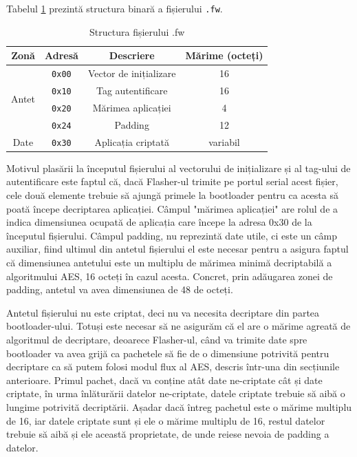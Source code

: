\documentclass[12pt,a4paper,titlepage]{report}
\begin{document}
Tabelul \ref{fwStruct} prezintă structura binară a fișierului \texttt{.fw}.

\begin{table}[h]
    \begin{tabular}{ | c | c | c | c | }
        \hline
        \textbf{Zonă} & \textbf{Adresă} & \textbf{Descriere} & \textbf{Mărime (octeți)} \\ \hline
        \multirow{4}{*}{Antet} & \texttt{0x00} & Vector de inițializare & 16 \\ \cline{2-4}
        & \texttt{0x10} & Tag autentificare & 16 \\ \cline{2-4}
        & \texttt{0x20} & Mărimea aplicației & 4 \\ \cline{2-4}   
        & \texttt{0x24} & Padding & 12 \\ \hline
        Date & \texttt{0x30} & Aplicația criptată & variabil \\ \hline
    \end{tabular}
    \centering
    \caption{Structura fișierului .fw}
    \label{fwStruct}
\end{table}

Motivul plasării la începutul fișierului al vectorului de inițializare și al tag-ului de autentificare este faptul că, dacă Flasher-ul trimite pe portul serial acest fișier, cele două elemente trebuie să ajungă primele la bootloader pentru ca acesta să poată începe decriptarea aplicației. Câmpul "mărimea aplicației" are rolul de a indica dimensiunea ocupată de aplicația care începe la adresa 0x30 de la începutul fișierului. Câmpul padding, nu reprezintă date utile, ci este un câmp auxiliar, fiind ultimul din antetul fișierului el este necesar pentru a asigura faptul că dimensiunea antetului este un multiplu de mărimea minimă decriptabilă a algoritmului AES, 16 octeți în cazul acesta. Concret, prin adăugarea zonei de padding, antetul va avea dimensiunea de 48 de octeți.

Antetul fișierului nu este criptat, deci nu va necesita decriptare din partea bootloader-ului. Totuși este necesar să ne asigurăm că el are o mărime agreată de algoritmul de decriptare, deoarece Flasher-ul, când va trimite date spre bootloader va avea grijă ca pachetele să fie de o dimensiune potrivită pentru decriptare ca să putem folosi modul flux al AES, descris într-una din secțiunile anterioare. Primul pachet, dacă va conține atât date ne-criptate cât și date criptate, în urma înlăturării datelor ne-criptate, datele criptate trebuie să aibă o lungime potrivită decriptării. Așadar dacă întreg pachetul este o mărime multiplu de 16, iar datele criptate sunt și ele o mărime multiplu de 16, restul datelor trebuie să aibă și ele această proprietate, de unde reiese nevoia de padding a datelor.
\end{document}
